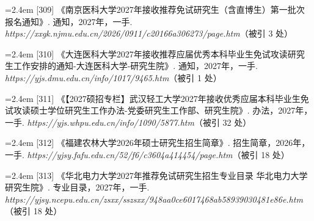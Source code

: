 {\vspace{0.6pt}
\vspace{3.5pt}\par
\nopagebreak\vspace{1pt}
\noindent\hangindent=2.4em \label{src:S0404}{\color{cAccent}[309]} 《南京医科大学2027年接收推荐免试研究生（含直博生）第一批次报名通知》. 通知，2027年，一手. \textit{https://xxgk.njmu.edu.cn/2026/0911/c20166a306273/page.htm}（被引 3 处）\par
\vspace{0.6pt}
\vspace{3.5pt}\par
\nopagebreak\vspace{1pt}
\noindent\hangindent=2.4em \label{src:S0408}{\color{cAccent}[310]} 《大连医科大学2027年接收推荐应届优秀本科毕业生免试攻读研究生工作安排的通知-大连医科大学-研究生院》. 通知，2027年，一手. \textit{https://yjs.dmu.edu.cn/info/1017/9465.htm}（被引 1 处）\par
\vspace{0.6pt}
\vspace{3.5pt}\par
\nopagebreak\vspace{1pt}
\noindent\hangindent=2.4em \label{src:S0409}{\color{cAccent}[311]} 《【2027硕招专栏】武汉轻工大学2027年接收优秀应届本科毕业生免试攻读硕士学位研究生工作办法-党委研究生工作部、研究生院》. 办法，2027年，一手. \textit{https://yjs.whpu.edu.cn/info/1090/5877.htm}（被引 32 处）\par
\vspace{0.6pt}
\vspace{3.5pt}\par
\nopagebreak\vspace{1pt}
\noindent\hangindent=2.4em \label{src:S0413}{\color{cAccent}[312]} 《福建农林大学2026年硕士研究生招生简章》. 招生简章，2026年，一手. \textit{https://yjsy.fafu.edu.cn/52/f6/c3604a414454/page.htm}（被引 18 处）\par
\vspace{0.6pt}
\vspace{3.5pt}\par
\nopagebreak\vspace{1pt}
\noindent\hangindent=2.4em \label{src:S0414}{\color{cAccent}[313]} 《华北电力大学2027年推荐免试研究生招生专业目录 华北电力大学研究生院》. 专业目录，2027年，一手. \textit{https://yjsy.ncepu.edu.cn/zsxx/sszsxx/948aa0ce6017468ab58939030481e86e.htm}（被引 18 处）\par
}
